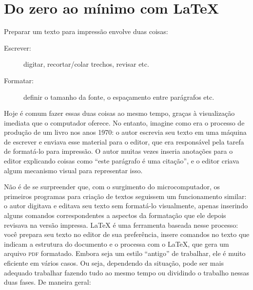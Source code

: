 

\newcommand{\sla}{\textbackslash}

\newcommand{\cmd}[1]{\textsf{#1}}

\newcommand{\pkg}[1]{\textsf{#1}}

\newcommand{\ltxcmd}[1]{\cmd{\sla{}#1}}

\chapter{Do zero ao mínimo com \LaTeX{}}
\label{chap:tutorial}

Preparar um texto para impressão envolve duas coisas:

\begin{description}
\item[Escrever:] digitar, recortar/colar trechos, revisar etc.
\item[Formatar:] definir o tamanho da fonte, o
espaçamento entre parágrafos etc.
\end{description}

Hoje é comum fazer essas duas coisas ao mesmo tempo, graças à visualização
imediata que o computador oferece. No entanto, imagine como era o processo de
produção de um livro nos anos 1970: o autor escrevia seu texto em uma máquina
de escrever e enviava esse material para o editor, que era responsável pela
tarefa de formatá-lo para impressão. O autor muitas vezes inseria anotações
para o editor explicando coisas como ``este parágrafo é uma citação'', e o
editor criava algum mecanismo visual para representar isso.

Não é de se surpreender que, com o surgimento do microcomputador, os primeiros
programas para criação de textos seguissem um funcionamento similar: o autor
digitava e editava seu texto sem formatá-lo visualmente, apenas inserindo
alguns comandos correspondentes a aspectos da formatação que ele depois
revisava na versão impressa. \LaTeX{} é uma ferramenta baseada nesse processo:
você prepara seu texto no editor de sua preferência, insere comandos no texto
que indicam a estrutura do documento e o processa com o \LaTeX{}, que gera um
arquivo \textsc{pdf} formatado. Embora seja um estilo ``antigo'' de trabalhar,
ele é muito eficiente em vários casos. Ou seja, dependendo da situação, pode
ser mais adequado trabalhar fazendo tudo ao mesmo tempo ou dividindo o trabalho
nessas duas fases. De maneira geral:

